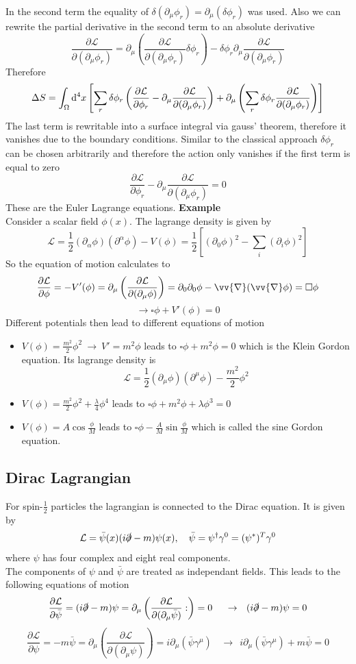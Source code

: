\documentclass{include/thesisclass}
\newcommand{\LL}{\mathcal{L}}
\newcommand{\df}{\rightarrow}
\newcommand{\dd}{{\rm d}}
\newcommand{\p}{\partial}
\newcommand{\vn}{\vv{\nabla}}
\newcommand{\dslash}{\slashed{\partial}}
\newcommand{\sub}[1]{\newline\newline\textbf{#1}\\}
\begin{document}
In the second term the equality of $\delta (\p _\mu \phi_r) = \p_\mu(\delta \phi_r)$ was used. Also we can rewrite the partial derivative in the second term to an absolute derivative
\[
\frac{\p \LL}{\p(\p_\mu \phi_r)} = \p_\mu \left( \frac{\p \LL}{\p ( \p_\mu \phi_r)} \delta\phi_r\right) - \delta \phi_r \p_\mu \frac{\p \LL}{\p(\p_\mu \phi_r)}
\]
Therefore
\[
\Delta S = \int_\Omega \dd ^4 x \left[ \sum_r \delta \phi_r \left( \frac{\p \LL}{\p \phi_r} - \p_\mu \frac{\p \LL}{\p(\p_\mu \phi_r)}\right) + \p_\mu \left( \sum_r \delta \phi_r \frac{\p \LL}{\p(\p_\mu \phi_r)} \right)\right]
\]
The last term is rewritable into a surface integral via gauss' theorem, therefore it vanishes due to the boundary conditions. Similar to the classical approach $\delta \phi_r$ can be chosen arbitrarily and therefore the action only vanishes if the first term is equal to zero
\[ 
\frac{\p \LL}{\p \phi_r} - \p_\mu \frac{\p \LL}{\p(\p_\mu \phi_r)} = 0
\]
These are the Euler Lagrange equations.
\sub{Example}
Consider a scalar field $\phi(x)$. The lagrange density is given by
\[ \LL = \frac{1}{2} (\p_\alpha \phi)(\p^\alpha \phi) - V(\phi) = \frac{1}{2} \left[ (\p_0\phi)^2 - \sum_i (\p_i \phi)^2\right]\]
So the equation of motion calculates to
\[ \frac{\p \LL}{\p \phi} = - V'(\phi) = \p_\mu \left( \frac{\p \LL}{\p(\p_\mu \phi)}\right) = \p_0 \p_0 \phi - \vn(\vn \phi) = \square \phi\]
\[\df \square \phi + V'(\phi) = 0\]
Different potentials then lead to different equations of motion
\begin{itemize}
\item $V(\phi) = \frac{m^2}{2}\phi^2 ~\df~ V' = m^2\phi$ leads to $\square\phi + m^2 \phi = 0$
which is the Klein Gordon equation. Its lagrange density is
\[ \LL = \frac{1}{2} (\p_\mu \phi)(\p^\mu \phi) - \frac{m^2}{2}\phi^2\]
\item $V(\phi) = \frac{m^2}{2}\phi^2 + \frac{\lambda}{4}\phi^4$ leads to $\square \phi + m^2 \phi + \lambda \phi^3  = 0$
\item $V(\phi) = A \cos \frac{\phi}{M}$ leads to $\square\phi - \frac{A}{M} \sin \frac{\phi}{M}$
which is called the sine Gordon equation.
\end{itemize}

\subsection{Dirac Lagrangian}
For spin-$\frac{1}{2}$ particles the lagrangian is connected to the Dirac equation. It is given by
\[ \LL = \bar{\psi}(x)(i \dslash - m) \psi(x),~~~\bar{\psi} = \psi^\dagger \gamma^0 = (\psi^*)^T \gamma^0\]
where $\psi$ has four complex and eight real components.\\
The components of $\psi$ and $\bar{\psi}$ are treated as independant fields. This leads to the following equations of motion
\[ \frac{\p \LL}{\p \bar{\psi}} = ( i \dslash - m)\psi = \p_\mu \left( \frac{\p \LL}{\p(\p_\mu \bar{\psi})}:\right) = 0~~~~\df ~~ (i \dslash - m) \psi = 0\]
\[ \frac{\p\LL}{\p\psi} = -m \bar{\psi} = \p_\mu\left( \frac{\p\LL}{\p(\p_\mu \psi)}\right) = i \p_\mu(\bar{\psi}\gamma^\mu)~~~~\df ~~ i \p_\mu(\bar{\psi}\gamma^\mu) + m \bar{\psi} = 0\]
\end{document}
